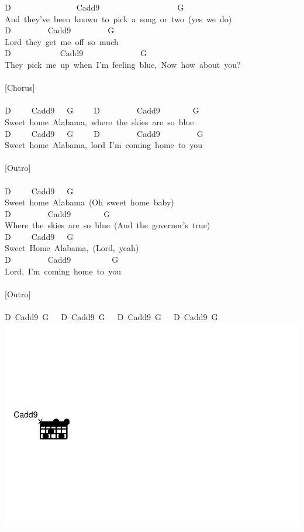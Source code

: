 \documentclass[]{book}
\begin{document}
D~~~~~~~~~~~~~~~~Cadd9~~~~~~~~~~~~~~~~~~~G\\
And~they've~been~known~to~pick~a~song~or~two~(yes~we~do)\\
D~~~~~~~~~Cadd9~~~~~~~~~G\\
Lord~they~get~me~off~so~much\\
D~~~~~~~~~~~~Cadd9~~~~~~~~~~~~~~G~~~~\\
They~pick~me~up~when~I'm~feeling~blue,~Now~how~about~you?\\
~\\
{[}Chorus{]}\\
~\\
D~~~~~Cadd9~~~G~~~~~D~~~~~~~~~Cadd9~~~~~~~~G~~~~~~~~~\\
Sweet~home~Alabama,~where~the~skies~are~so~blue\\
D~~~~~Cadd9~~~G~~~~~D~~~~~~~~~Cadd9~~~~~~~~~G~~~~~~\\
Sweet~home~Alabama,~lord~I'm~coming~home~to~you\\
~\\
{[}Outro{]}\\
~\\
D~~~~~Cadd9~~~G~~~~~~\\
Sweet~home~Alabama~(Oh~sweet~home~baby)\\
D~~~~~~~~~Cadd9~~~~~~~~G~~~~\\
Where~the~skies~are~so~blue~(And~the~governor's~true)\\
D~~~~~Cadd9~~~G\\
Sweet~Home~Alabama,~(Lord,~yeah)\\
D~~~~~~~~~Cadd9~~~~~~~~~~G\\
Lord,~I'm~coming~home~to~you\\
~\\
{[}Outro{]}\\
~\\
D~Cadd9~G~~~D~Cadd9~G~~~D~Cadd9~G~~~D~Cadd9~G\\

\includegraphics{Songs_files/figure-latex/unnamed-chunk-32-1.pdf}
\end{document}
